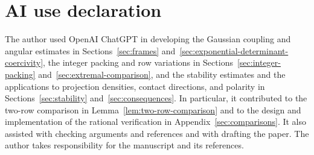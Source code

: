 \documentclass[11pt,a4paper]{article}
\theoremstyle{remark}\newtheorem{remark}[theorem]{Remark}
\numberwithin{equation}{section}
\begin{document}
\section*{AI use declaration}
The author used OpenAI ChatGPT in developing the Gaussian coupling and
angular estimates in Sections~\ref{sec:frames} and~\ref{sec:exponential-determinant-coercivity},
the integer packing and row variations in Sections~\ref{sec:integer-packing}
and~\ref{sec:extremal-comparison}, and the stability estimates and the applications to
projection densities, contact directions, and polarity in Sections~\ref{sec:stability} and~\ref{sec:consequences}.
In particular, it contributed to the two-row comparison in
Lemma~\ref{lem:two-row-comparison} and to the design and implementation of the
rational verification in Appendix~\ref{sec:comparisons}. It also assisted
with checking arguments and references and with drafting the paper.
The author takes responsibility for the manuscript and its references.
\end{document}

